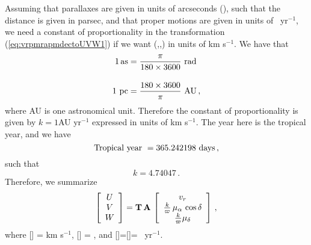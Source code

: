 Assuming that parallaxes are given in units of arcseconds (\arcsecs),
such that the distance is given in parsec, and that proper motions are
given in units of \arcsecs\ yr$^{-1}$, we need a constant of
proportionality in the transformation (\ref{eq:vrpmrapmdectoUVW1}) if
we want (\galU,\galV,\galW) in units of km s$^{-1}$. We have that
\begin{align}
1 \, \textnormal{as} &= \frac{\pi}{180 \times 3600} \textnormal{  rad}\,\\[10pt]
1 \textnormal{ pc} &= \frac{180 \times 3600}{\pi} \textnormal{  AU}\, ,
\end{align}
where AU is one astronomical unit. Therefore the constant of
proportionality is given by $k = 1 $AU yr$^{-1}$ expressed in units of km s$^{-1}$. The year here is the tropical year, and we have
\begin{equation}
\textnormal{Tropical year } = 365.242198 \textnormal{ days}\, ,
\end{equation}
such that
\begin{equation}
k = 4.74047\, .
\end{equation}
Therefore, we summarize
\begin{equation}\label{eq:vrpmrapmdectoUVW2}
\left[ \begin{array}{c} U \\ V \\ W \end{array} \right] =
\mathbf{T} \, \mathbf{A} \, \left[ \begin{array}{c} v_r  \\ \frac{k}{\varpi}\,\mu_{\alpha}\,\cos\delta\\\frac{k}{\varpi}\mu_{\delta}\end{array} \right]\, ,
\end{equation}
where [\vrr] = km s$^{-1}$, [\parallax] = \arcsecs, and [\pmra]=[\pmdec]= \arcsecs\ yr$^{-1}$.


